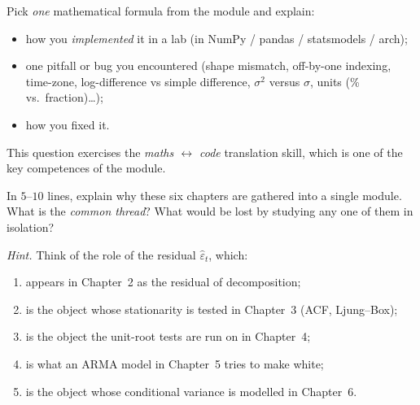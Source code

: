 \documentclass[a4paper,11pt]{article}
\begin{document}
\begin{question}
Pick \emph{one} mathematical formula from the module and explain:
\begin{itemize}
  \item how you \emph{implemented} it in a lab (in NumPy / pandas /
        statsmodels / arch);
  \item one pitfall or bug you encountered (shape mismatch,
        off-by-one indexing, time-zone, log-difference vs simple
        difference, $\sigma^2$ versus $\sigma$, units (\% vs.\
        fraction)\dots);
  \item how you fixed it.
\end{itemize}
This question exercises the \emph{maths $\leftrightarrow$ code}
translation skill, which is one of the key competences of the
module.
\end{question}

\begin{question}
In $5$--$10$ lines, explain why these six chapters are gathered
into a single module. What is the \emph{common thread}? What would
be lost by studying any one of them in isolation?

\medskip
\textit{Hint.} Think of the role of the residual $\widehat
\varepsilon_t$, which:
\begin{enumerate}
  \item appears in Chapter~2 as the residual of decomposition;
  \item is the object whose stationarity is tested in Chapter~3
        (ACF, Ljung--Box);
  \item is the object the unit-root tests are run on in Chapter~4;
  \item is what an ARMA model in Chapter~5 tries to make white;
  \item is the object whose conditional variance is modelled in
        Chapter~6.
\end{enumerate}
\end{question}
\end{document}
